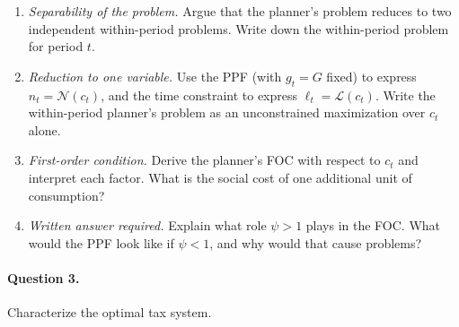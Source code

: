 \begin{enumerate}[label=(\alph*)]
    \item \emph{Separability of the problem.} Argue that the planner's problem reduces to two independent within-period problems. Write down the within-period problem for period $t$.
 
    \item \emph{Reduction to one variable.} Use the PPF (with $g_t = G$ fixed) to express $n_t = \mathcal{N}(c_t)$, and the time constraint to express $\ell_t = \mathcal{L}(c_t)$. Write the within-period planner's problem as an unconstrained maximization over $c_t$ alone.
 
    \item \emph{First-order condition.} Derive the planner's FOC with respect to $c_t$ and interpret each factor. What is the social cost of one additional unit of consumption?
 
    \item \emph{Written answer required.} Explain what role $\psi > 1$ plays in the FOC. What would the PPF look like if $\psi < 1$, and why would that cause problems?
\end{enumerate}
 
\paragraph{Question 3.}
Characterize the optimal tax system.
 
